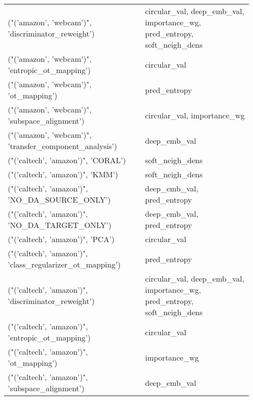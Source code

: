 \begin{tabular}{ll}
 ("('amazon', 'webcam')", 'discriminator\_reweight')        & circular\_val, deep\_emb\_val, importance\_wg, pred\_entropy, soft\_neigh\_dens \\
 ("('amazon', 'webcam')", 'entropic\_ot\_mapping')           & circular\_val                                                             \\
 ("('amazon', 'webcam')", 'ot\_mapping')                    & pred\_entropy                                                             \\
 ("('amazon', 'webcam')", 'subspace\_alignment')            & circular\_val, importance\_wg                                              \\
 ("('amazon', 'webcam')", 'transfer\_component\_analysis')   & deep\_emb\_val                                                             \\
 ("('caltech', 'amazon')", 'CORAL')                        & soft\_neigh\_dens                                                          \\
 ("('caltech', 'amazon')", 'KMM')                          & soft\_neigh\_dens                                                          \\
 ("('caltech', 'amazon')", 'NO\_DA\_SOURCE\_ONLY')            & deep\_emb\_val, pred\_entropy                                               \\
 ("('caltech', 'amazon')", 'NO\_DA\_TARGET\_ONLY')            & deep\_emb\_val, pred\_entropy                                               \\
 ("('caltech', 'amazon')", 'PCA')                          & circular\_val                                                             \\
 ("('caltech', 'amazon')", 'class\_regularizer\_ot\_mapping') & pred\_entropy                                                             \\
 ("('caltech', 'amazon')", 'discriminator\_reweight')       & circular\_val, deep\_emb\_val, importance\_wg, pred\_entropy, soft\_neigh\_dens \\
 ("('caltech', 'amazon')", 'entropic\_ot\_mapping')          & circular\_val                                                             \\
 ("('caltech', 'amazon')", 'ot\_mapping')                   & importance\_wg                                                            \\
 ("('caltech', 'amazon')", 'subspace\_alignment')           & deep\_emb\_val                                                             \\

\end{tabular}
